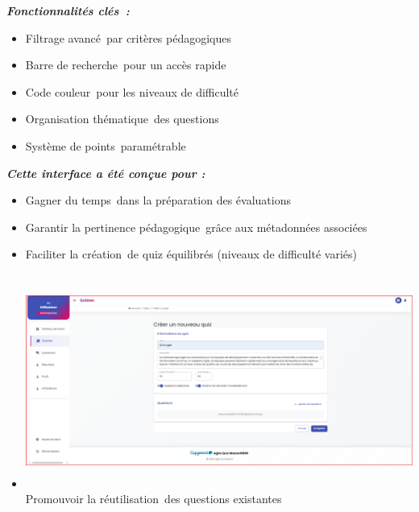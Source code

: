 \documentclass[12pt,a4paper,twoside,openright]{report}
\begin{document}
\emph{\textbf{Fonctionnalités clés~:}}

\begin{itemize}
\item
  Filtrage avancé~par critères pédagogiques
\item
  Barre de recherche~pour un accès rapide
\item
  Code couleur~pour les niveaux de difficulté
\item
  Organisation thématique~des questions
\item
  Système de points~paramétrable
\end{itemize}

\emph{\textbf{Cette interface a été conçue pour :}}

\begin{itemize}
\item
  Gagner du temps~dans la préparation des évaluations
\item
  Garantir la pertinence pédagogique~grâce aux métadonnées associées
\item
  Faciliter la création~de quiz équilibrés (niveaux de difficulté
  variés)
\item
  \includegraphics[width=6.3in,height=2.76944in]{latex_media/media/image56.png}Promouvoir
  la réutilisation~des questions existantes
\end{itemize}
\end{document}
